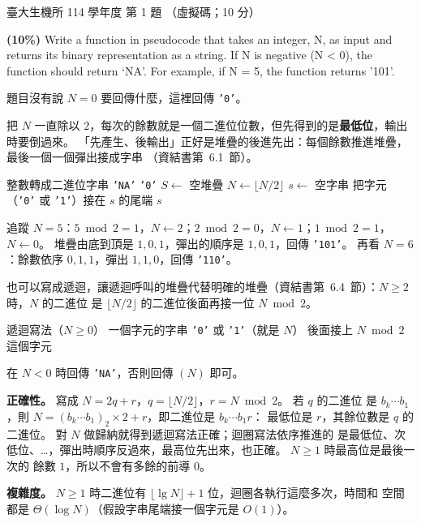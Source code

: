 \begin{pastexam}[label={px:ntu-114-bime-ds-01}]{臺大生機所 114 學年度 第 1 題}
（虛擬碼；10 分）

\textbf{(10\%)} Write a function in pseudocode that takes an integer, N, as input and returns its
binary representation as a string. If N is negative (N < 0), the function should return `NA'. For
example, if N = 5, the function returns '101'.
\end{pastexam}

\begin{pastsoln}
題目沒有說 $N = 0$ 要回傳什麼，這裡回傳 \texttt{'0'}。

把 $N$ 一直除以 $2$，每次的餘數就是一個二進位位數，但先得到的是\textbf{最低位}，輸出時要倒過來。
「先產生、後輸出」正好是堆疊的後進先出：每個餘數推進堆疊，最後一個一個彈出接成字串
（資結書第~6.1~節）。

\begin{pseudo}{整數轉成二進位字串}
        \State \Return \texttt{'NA'}
    \EndIf
        \State \Return \texttt{'0'}
    \EndIf
    \State $S \gets$ 空堆疊
        \State {} 
        \State $N \gets \lfloor N / 2 \rfloor$
    \EndWhile
    \State $s \gets$ 空字串
        \State 把字元 （\texttt{'0'} 或 \texttt{'1'}）接在 $s$ 的尾端
    \EndWhile
    \State \Return $s$
\EndFunction
\end{pseudo}

追蹤 $N = 5$：$5 \bmod 2 = 1$，$N \gets 2$；$2 \bmod 2 = 0$，$N \gets 1$；$1 \bmod 2 = 1$，
$N \gets 0$。 堆疊由底到頂是 $1, 0, 1$，彈出的順序是 $1, 0, 1$，回傳 \texttt{'101'}。 再看
$N = 6$：餘數依序 $0, 1, 1$，彈出 $1, 1, 0$，回傳 \texttt{'110'}。

也可以寫成遞迴，讓遞迴呼叫的堆疊代替明確的堆疊（資結書第~6.4~節）：$N \ge 2$ 時，$N$ 的二進位
是 $\lfloor N/2 \rfloor$ 的二進位後面再接一位 $N \bmod 2$。

\begin{pseudo}{遞迴寫法（$N \ge 0$）}
        \State \Return 一個字元的字串 \texttt{'0'} 或 \texttt{'1'}（就是 $N$）
    \EndIf
    \State \Return {} 後面接上 $N \bmod 2$ 這個字元
\EndFunction
\end{pseudo}
 在 $N < 0$ 時回傳 \texttt{'NA'}，否則回傳 $(N)$ 即可。

\textbf{正確性。} 寫成 $N = 2q + r$，$q = \lfloor N/2 \rfloor$，$r = N \bmod 2$。 若 $q$ 的二進位
是 $b_{k} \cdots b_{1}$，則 $N = (b_k \cdots b_1)_2 \times 2 + r$，即二進位是 $b_k \cdots b_1 r$：
最低位是 $r$，其餘位數是 $q$ 的二進位。 對 $N$ 做歸納就得到遞迴寫法正確；迴圈寫法依序推進的
是最低位、次低位、…，彈出時順序反過來，最高位先出來，也正確。 $N \ge 1$ 時最高位是最後一次的
餘數 $1$，所以不會有多餘的前導 $0$。

\textbf{複雜度。} $N \ge 1$ 時二進位有 $\lfloor \lg N \rfloor + 1$ 位，迴圈各執行這麼多次，時間和
空間都是 $\Theta(\log N)$（假設字串尾端接一個字元是 $O(1)$）。
\end{pastsoln}
